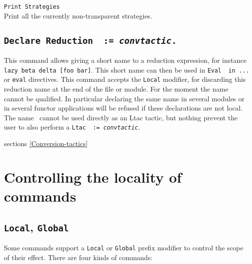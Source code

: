 \begin{Variants}
\item {\tt Print Strategies}\\
  Print all the currently non-transparent strategies.
\end{Variants}

\subsection{\tt Declare Reduction \ident\ := {\rm\sl convtactic}.}

This command allows giving a short name to a reduction expression,
for instance {\tt lazy beta delta [foo bar]}. This short name can
then be used in {\tt Eval \ident\ in ...} or {\tt eval} directives.
This command accepts the {\tt Local} modifier, for discarding
this reduction name at the end of the file or module. For the moment
the name cannot be qualified. In particular declaring the same name
in several modules or in several functor applications will be refused
if these declarations are not local. The name \ident\ cannot be used
directly as an Ltac tactic, but nothing prevent the user to also
perform a {\tt Ltac \ident\ := {\rm\sl convtactic}}.

\SeeAlso sections \ref{Conversion-tactics}

\section{Controlling the locality of commands}

\subsection{{\tt Local}, {\tt Global}
}

Some commands support a {\tt Local} or {\tt Global} prefix modifier to
control the scope of their effect. There are four kinds of commands:

